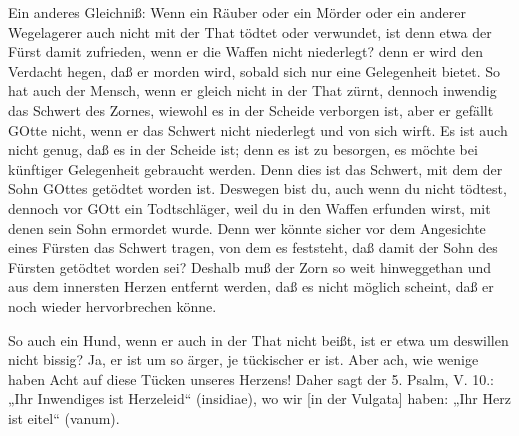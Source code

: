 Ein anderes Gleichniß: Wenn ein Räuber oder ein Mörder oder ein anderer Wegelagerer auch nicht mit der That tödtet oder verwundet, ist denn etwa der Fürst damit zufrieden, wenn er die Waffen nicht niederlegt? denn er wird den Verdacht hegen, daß er morden wird, sobald sich nur eine Gelegenheit bietet. So hat auch der Mensch, wenn er gleich nicht in der That zürnt, dennoch inwendig das Schwert des Zornes, wiewohl es in der Scheide verborgen ist, aber er gefällt GOtte nicht, wenn er das Schwert nicht niederlegt und von sich wirft. Es ist auch nicht genug, daß es in der Scheide ist; denn es ist zu besorgen, es möchte bei künftiger Gelegenheit gebraucht werden. Denn dies ist das Schwert, mit dem der Sohn GOttes getödtet worden ist. Deswegen bist du, auch wenn du nicht tödtest, dennoch vor GOtt ein Todtschläger, weil du in den Waffen erfunden wirst, mit denen sein Sohn ermordet wurde. Denn wer könnte sicher vor dem Angesichte eines Fürsten das Schwert tragen, von dem es feststeht, daß damit der Sohn des Fürsten getödtet worden sei? Deshalb muß der Zorn so weit hinweggethan und aus dem innersten Herzen entfernt werden, daß es nicht möglich scheint, daß er noch wieder hervorbrechen könne.

So auch ein Hund, wenn er auch in der That nicht beißt, ist er etwa um deswillen nicht bissig? Ja, er ist um so ärger, je tückischer er ist. Aber ach, wie wenige haben Acht auf diese Tücken unseres Herzens! Daher sagt der 5. Psalm, V. 10.: „Ihr Inwendiges ist Herzeleid“ (insidiae), wo wir [in der Vulgata] haben: „Ihr Herz ist eitel“ (vanum).

